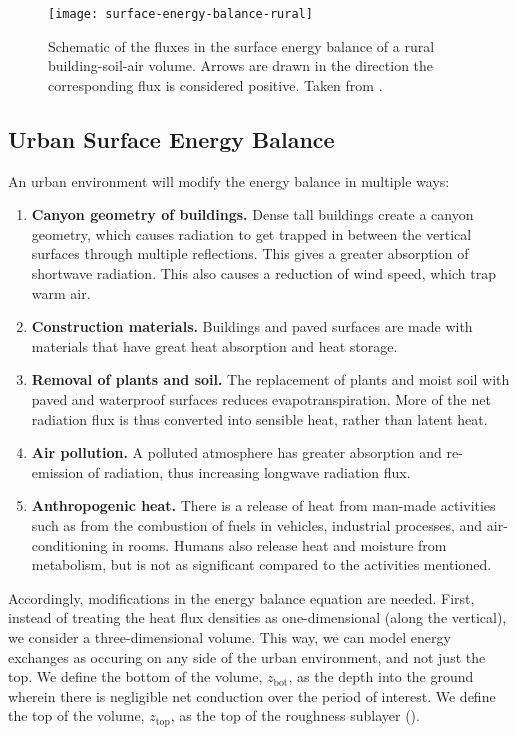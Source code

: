 		\begin{figure}	
			\centering
			\texttt{[image: surface-energy-balance-rural]}
			\caption{
				Schematic of the fluxes in the surface energy balance of a rural building-soil-air volume. 
				Arrows are drawn in the direction the corresponding flux is considered positive.
				Taken from \textcite{Oke2017urban}.
			}
			\label{fig:surface-energy-balance-rural}
		\end{figure}
		

	\subsection{Urban Surface Energy Balance}

		An urban environment will modify the energy balance in multiple ways:
		\begin{enumerate}
			\item \textbf{Canyon geometry of buildings.}
			Dense tall buildings create a canyon geometry,
				which causes radiation to get trapped in between the vertical surfaces through multiple reflections.
			This gives a greater absorption of shortwave radiation.
			This also causes a reduction of wind speed, which trap warm air.
			
			\item \textbf{Construction materials.}
			Buildings and paved surfaces are made with materials that have great heat absorption and heat storage.
			
			\item \textbf{Removal of plants and soil.}
			The replacement of plants and moist soil with paved and waterproof surfaces reduces evapotranspiration.
			More of the net radiation flux is thus converted into sensible heat, rather than latent heat.
			
			\item \textbf{Air pollution.}
			A polluted atmosphere has greater absorption and re-emission of radiation, thus increasing longwave radiation flux.
			
			\item \textbf{Anthropogenic heat.}
			There is a release of heat from man-made activities such as from
				the combustion of fuels in vehicles,
				industrial processes, and
				air-conditioning in rooms.
			Humans also release heat and moisture from metabolism, but is not as significant compared to the activities mentioned.
		\end{enumerate}
	
		Accordingly, modifications in the energy balance equation are needed.
		First, instead of treating the heat flux densities as one-dimensional (along the vertical),
			we consider a three-dimensional volume.
		This way, we can model energy exchanges as occuring on any side of the urban environment, and not just the top.
		We define the bottom of the volume, $z_\text{bot}$, as the depth into the ground wherein there is negligible net conduction over the period of interest.
		We define the top of the volume, $z_\text{top}$, as the top of the roughness sublayer (\cite{Oke2017urban}).
		
